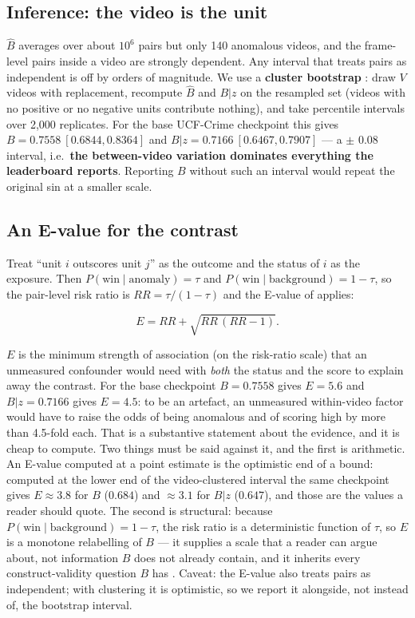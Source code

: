\documentclass[number,preprint,12pt]{elsarticle}
\begin{document}
\subsection{Inference: the video is the unit}\label{sec:inference}

\(\hat{B}\) averages over about \(10^6\) pairs but only 140 anomalous videos, and the frame-level
pairs inside a video are strongly dependent. Any interval that treats pairs as
independent is off by orders of magnitude. We use a \textbf{cluster bootstrap} \citep{efron1993introduction}: draw
\(V\) videos with replacement, recompute \(\hat{B}\) and \(B|z\) on the resampled set
(videos with no positive or no negative units contribute nothing), and take
percentile intervals over 2,000 replicates. For the base UCF-Crime checkpoint
this gives \(B=0.7558\ [0.6844,0.8364]\) and \(B|z=0.7166\ [0.6467,0.7907]\) ---
a \(\pm\) 0.08 interval, i.e.~\textbf{the between-video variation dominates everything the
leaderboard reports}. Reporting \(B\) without such an interval would repeat the
original sin at a smaller scale.

\subsection{An E-value for the contrast}\label{sec:evalue}

Treat ``unit \(i\) outscores unit \(j\)'' as the outcome and the status of \(i\) as the
exposure. Then \(P(\mathrm{win}\mid\mathrm{anomaly})=\tau\) and \(P(\mathrm{win}\mid\mathrm{background})=1-\tau\), so the
pair-level risk ratio is \(RR=\tau/(1-\tau)\) and the E-value of \citet{vanderweele2017sensitivity}
applies:

\begin{equation}
E=RR+\sqrt{RR\,(RR-1)}.
\end{equation}

\(E\) is the minimum strength of association (on the risk-ratio scale) that an
unmeasured confounder would need with \emph{both} the status and the score to
explain away the contrast. For the base checkpoint \(B=0.7558\) gives \(E = 5.6\)
and \(B|z=0.7166\) gives \(E = 4.5\): to be an artefact, an unmeasured
within-video factor would have to raise the odds of being anomalous and of
scoring high by more than 4.5-fold each. That is a substantive statement about
the evidence, and it is cheap to compute. Two things must be said against it, and
the first is arithmetic. An E-value computed at a point estimate is the optimistic
end of a bound: computed at the lower end of the video-clustered interval the same
checkpoint gives \(E\approx3.8\) for \(B\) (\(0.684\)) and \(\approx3.1\) for \(B|z\)
(\(0.647\)), and those are the values a reader should quote. The second is
structural: because \(P(\mathrm{win}\mid\mathrm{background})=1-\tau\), the risk ratio is a
deterministic function of \(\tau\), so \(E\) is a monotone relabelling of \(B\) --- it
supplies a scale that a reader can argue about, not information \(B\) does not
already contain, and it inherits every construct-validity question \(B\) has
\citep{campbell1959convergent}.
Caveat: the E-value also treats pairs as independent; with clustering it is
optimistic, so we report it alongside, not instead of, the bootstrap interval.
\end{document}
